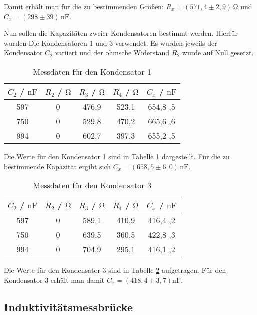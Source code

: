 Damit erhält man für die zu bestimmenden Größen: $R_x = (571,4 \pm 2,9) \, \si{\ohm}$ und $C_x = (298 \pm 39)\,\si{\nano\farad}$.



Nun sollen die Kapazitäten zweier Kondensatoren bestimmt werden.
Hierfür wurden Die Kondensatoren 1 und 3 verwendet.
Es wurden jeweils der Kondensator $C_2$ variiert und der ohmsche Widerstand $R_2$ wurde auf Null gesetzt.

	\begin{table}
		\centering
		\caption{Messdaten für den Kondensator 1}
		\label{tab:kapa1}
	\begin{tabular}{ccccc}
		\toprule
		$C_2$ / $\si{\nano\farad}$ & $R_2$ / $\si{\ohm}$ & $R_3$ / $\si{\ohm}$ & $R_4$ / $\si{\ohm}$ & $C_x$ / $\si{\nano\farad}$ \\
		\midrule
		597 & 0 & 476,9 & 523,1 & 654,8 \pm 3,5 \\
		750 & 0 & 529,8 & 470,2 & 665,6 \pm 3,6 \\
		994 & 0 & 602,7 & 397,3 & 655,2 \pm 3,5 \\
		\bottomrule
	\end{tabular}
	\end{table}

Die Werte für den Kondensator 1 sind in Tabelle \ref{tab:kapa1} dargestellt. Für die zu bestimmende Kapazität ergibt sich $C_x = (658,5 \pm 6,0)\, \si{\nano\farad}$.


	\begin{table}
		\centering
		\caption{Messdaten für den Kondensator 3}
		\label{tab:kapa3}
	\begin{tabular}{ccccc}
		\toprule
		$C_2$ / $\si{\nano\farad}$ & $R_2$ / $\si{\ohm}$ & $R_3$ / $\si{\ohm}$ & $R_4$ / $\si{\ohm}$ & $C_x$ / $\si{\nano\farad}$ \\
		\midrule
		597 & 0 & 589,1 & 410,9 & 416,4 \pm 2,2 \\
		750 & 0 & 639,5 & 360,5 & 422,8 \pm 2,3 \\
		994 & 0 & 704,9 & 295,1 & 416,1 \pm 2,2 \\
		\bottomrule
	\end{tabular}
	\end{table}
Die Werte für den Kondensator 3 sind in Tabelle \ref{tab:kapa3} aufgetragen. Für den Kondensator 3 erhält man damit $C_x = (418,4 \pm 3,7)\si{\nano\farad}$.


\subsection{Induktivitätsmessbrücke}


